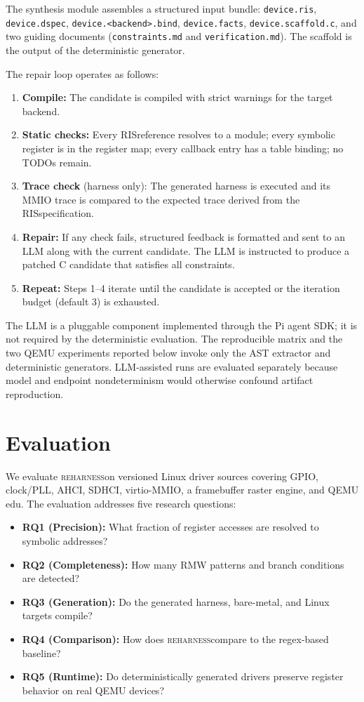 \documentclass[sigconf,review]{acmart}
\newcommand{\reharness}{\textsc{reharness}}
\newcommand{\rislang}{RIS}
\begin{document}
The synthesis module assembles a structured input bundle: \texttt{device.ris}, \texttt{device.dspec}, \texttt{device.<backend>.bind}, \texttt{device.facts}, \texttt{device.scaffold.c}, and two guiding documents (\texttt{constraints.md} and \texttt{verification.md}). The scaffold is the output of the deterministic generator.

The repair loop operates as follows:

\begin{enumerate}
\item \textbf{Compile:} The candidate is compiled with strict warnings for the target backend.
\item \textbf{Static checks:} Every \rislang reference resolves to a module; every symbolic register is in the register map; every callback entry has a table binding; no TODOs remain.
\item \textbf{Trace check} (harness only): The generated harness is executed and its MMIO trace is compared to the expected trace derived from the \rislang specification.
\item \textbf{Repair:} If any check fails, structured feedback is formatted and sent to an LLM along with the current candidate. The LLM is instructed to produce a patched C candidate that satisfies all constraints.
\item \textbf{Repeat:} Steps 1--4 iterate until the candidate is accepted or the iteration budget (default 3) is exhausted.
\end{enumerate}

The LLM is a pluggable component implemented through the Pi agent SDK; it is not required by the deterministic evaluation. The reproducible matrix and the two QEMU experiments reported below invoke only the AST extractor and deterministic generators. LLM-assisted runs are evaluated separately because model and endpoint nondeterminism would otherwise confound artifact reproduction.

\section{Evaluation}

We evaluate \reharness on \EvalDrivers{} versioned Linux driver sources covering GPIO, clock/PLL, AHCI, SDHCI, virtio-MMIO, a framebuffer raster engine, and QEMU edu. The evaluation addresses five research questions:

\begin{itemize}
\item \textbf{RQ1 (Precision):} What fraction of register accesses are resolved to symbolic addresses?
\item \textbf{RQ2 (Completeness):} How many RMW patterns and branch conditions are detected?
\item \textbf{RQ3 (Generation):} Do the generated harness, bare-metal, and Linux targets compile?
\item \textbf{RQ4 (Comparison):} How does \reharness compare to the regex-based baseline?
\item \textbf{RQ5 (Runtime):} Do deterministically generated drivers preserve register behavior on real QEMU devices?
\end{itemize}
\end{document}
